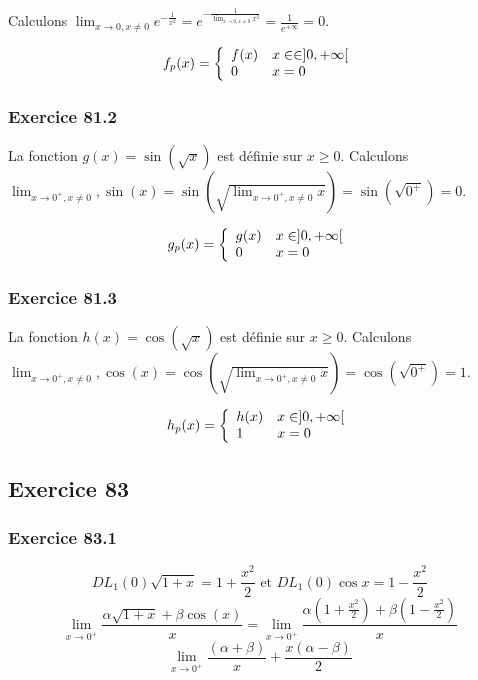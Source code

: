 \documentclass[]{book}
\theoremstyle{definition}
\begin{document}
Calculons $\lim_{x \to 0, x \neq 0} e^{-\frac{1}{x^2}} = e^{-\frac{1}{\lim_{x \to 0, x \neq 0} x^2}} = \frac{1}{e^{+\infty}} = 0$.

$$f_p(x) =
\left\{ 
\begin{array}{l l}
f(x) & x \in \in ]0,+\infty[ \\
0 & x = 0\\
\end{array}
\right. 
$$ 


\subsubsection*{Exercice 81.2}
La fonction $g(x) = \sin(\sqrt{x})$ est d\'efinie sur $x \geq 0$. Calculons $\lim_{x \to 0^{+}, x \neq 0}, \sin(x) = \sin(\sqrt{\lim_{x \to 0^{+},x \neq 0} x}) = \sin(\sqrt{0^{+}}) = 0$.

$$g_p(x) =
\left\{ 
\begin{array}{l l}
g(x) & x \in ]0,+\infty[ \\
0 & x = 0\\
\end{array}
\right. 
$$ 


\subsubsection*{Exercice 81.3}
La fonction $h(x) = \cos(\sqrt{x})$ est d\'efinie sur $x \geq 0$. Calculons $\lim_{x \to 0^{+}, x \neq 0}, \cos(x) = \cos(\sqrt{\lim_{x \to 0^{+},x \neq 0} x}) = \cos(\sqrt{0^{+}}) = 1$.

$$h_p(x) =
\left\{ 
\begin{array}{l l}
h(x) & x \in ]0,+\infty[ \\
1 & x = 0\\
\end{array}
\right. 
$$ 


\subsection*{Exercice 83}
\subsubsection*{Exercice 83.1}
$$DL_1(0)\sqrt{1+x} = 1+\frac{x^2}{2} \textrm{   et   } DL_1(0)\cos{x} = 1 - \frac{x^2}{2}$$
$$\lim_{x\to0^{+}} \frac{\alpha\sqrt{1+x} + \beta\cos(x)}{x} = \lim_{x\to0^{+}} \frac{\alpha(1 + \frac{x^2}{2}) + \beta(1 - \frac{x^2}{2})}{x}$$
$$\lim_{x\to0^{+}} \frac{(\alpha+\beta)}{x}+\frac{x(\alpha-\beta)}{2}$$
\end{document}
